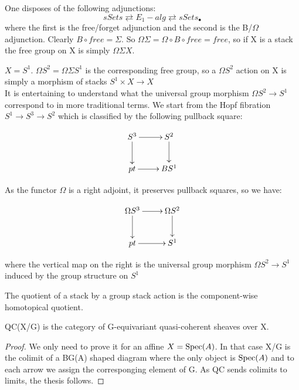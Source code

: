 \begin{refsection}
\begin{rmk}
One disposes of the following adjunctions:
$$sSets\rightleftarrows E_1-alg\rightleftarrows sSets_{\bullet}$$
where the first is the free/forget adjunction and the second is the B/$\Omega$ adjunction. Clearly $B\circ free=\Sigma$. So $\Omega\Sigma=\Omega\circ B\circ free=free$, so
if X is a stack the free group on X is simply $\Omega\Sigma X$.
\end{rmk}

\begin{eg}
$X=S^1$. $\Omega S^2 =\Omega\Sigma S^1$ is the corresponding free group, so a $\Omega S^2$ action on X is simply a morphism of stacks $S^1\times X\to X$\\
It is entertaining to understand what the universal group morphism $\Omega S^2\to S^1$ correspond to in more traditional terms. We start from the Hopf fibration $S^1\to S^3\to S^2$
which is classified by the following pullback square:

\begin{displaymath}
\xymatrix{
S^3 \ar[r] \ar[d] &  S^2 \ar[d]\\
 pt \ar[r] & BS^1\\
}
\end{displaymath}

As the functor $\Omega$ is a right adjoint, it preserves pullback squares, so we have:

\begin{displaymath}
\xymatrix{
\Omega S^3 \ar[r] \ar[d] &  \Omega S^2 \ar[d]\\
 pt \ar[r] & S^1\\
}
\end{displaymath}

where the vertical map on the right is the universal group morphism $\Omega S^2\to S^1$ induced by the group structure on $S^1$
\end{eg}

The quotient of a stack by a group stack action is the component-wise homotopical quotient.

\begin{prop}
QC(X/G) is the category of G-equivariant quasi-coherent sheaves over X.
\end{prop}
 
\begin{proof}
We only need to prove it for an affine $X=\mathrm{Spec}(A)$. In that case X/G is the colimit of a BG(A) shaped diagram where the only object is $\mathrm{Spec}(A)$ and to each arrow we assign
the corresponging element of G. As QC sends colimits to limits, the thesis follows.
\end{proof}


\end{refsection}
